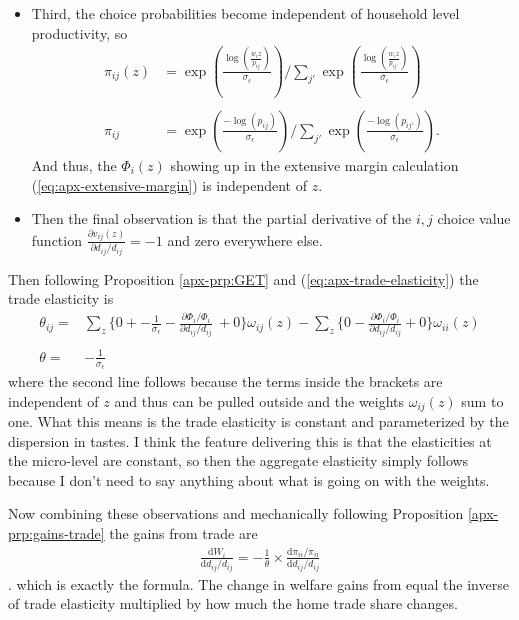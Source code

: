 \documentclass[12pt,pdftex]{article}
\begin{document}
\begin{onehalfspacing}
\begin{itemize}
\item Third, the choice probabilities become independent of household level productivity, so
\begin{align}
\nonumber \pi_{ij}(z) &= \exp \left( \frac{ \log\left( \frac{w_{i}z}{p_{ij}} \right) }{\sigma_{\epsilon}} \right) \Bigg / \sum_{j'} \exp \left( \frac{  \log\left( \frac{w_{i}z}{p_{ij'}} \right) }{\sigma_{\epsilon}} \right) \\
\nonumber \\
\nonumber \pi_{ij} &= \exp \left( \frac{ -\log\left( p_{ij} \right) }{\sigma_{\epsilon}} \right) \Bigg / \sum_{j'} \exp \left( \frac{  -\log\left( p_{ij'} \right) }{\sigma_{\epsilon}} \right).
\end{align}
And thus, the $\Phi_{i}(z)$ showing up in the extensive margin calculation (\ref{eq:apx-extensive-margin}) is independent of $z$.

\item Then the final observation is that the partial derivative of the $i,j$ choice value function $\frac{\partial v_{ij}(z)}{\partial d_{ij}/d_{ij}} = -1$ and zero everywhere else.
\end{itemize}
Then following Proposition \ref{apx-prp:GET} and (\ref{eq:apx-trade-elasticity}) the trade elasticity is
\begin{align}
\nonumber
\theta_{ij} =& \sum_{z} \bigg \{ 0 + -\frac{1}{\sigma_{\epsilon}} - \frac{\partial \Phi_{i} / \Phi_{i}}{\partial d_{ij}/d_{ij}} \ + 0 \bigg \}\omega_{ij}(z) - \sum_{z} \bigg \{  0 - \frac{\partial \Phi_{i} / \Phi_{i}}{\partial d_{ij}/d_{ij}} + 0 \bigg \}\omega_{ii}(z) \\
\nonumber \\
\theta =& -\frac{1}{\sigma_{\epsilon}} \nonumber
\end{align}
where the second line follows because the terms inside the brackets are independent of $z$ and thus can be pulled outside and the weights $\omega_{ij}(z)$ sum to one. What this means is the trade elasticity is constant and parameterized by the dispersion in tastes. I think the feature delivering this is that the elasticities at the micro-level are constant, so then the aggregate elasticity simply follows because I don't need to say anything about what is going on with the weights.

Now combining these observations and mechanically following Proposition \ref{apx-prp:gains-trade} the gains from trade are
\begin{align}
\frac{\mathrm{d} W_{i}}{\mathrm{d} d_{ij} / d_{ij}} = -\frac{1}{\theta} \times \frac{\mathrm{d} \pi_{ii} / \pi_{ii}}{\mathrm{d}d_{ij} / d_{ij}}
\end{align}.
which is exactly the \citet{arkolakis2012new} formula. The change in welfare gains from equal the inverse of trade elasticity multiplied by how much the home trade share changes.


\end{onehalfspacing}
\end{document}

